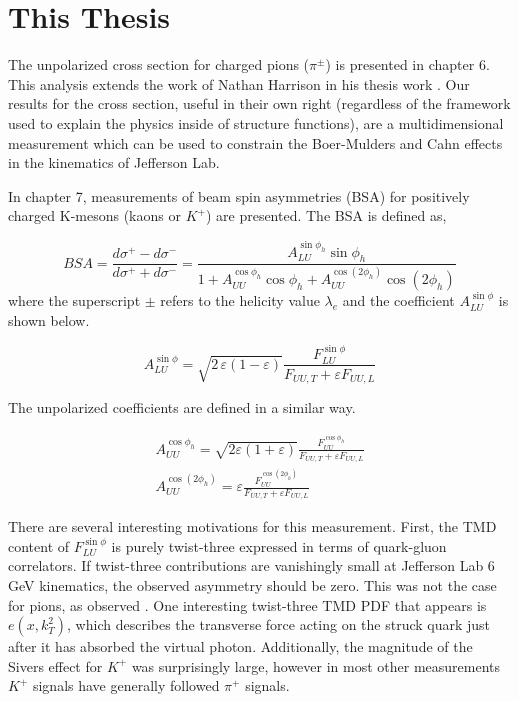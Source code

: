 \section{This Thesis}
The unpolarized cross section for charged pions ($\pi^{\pm}$) is presented in chapter 6.  This analysis extends the work of Nathan Harrison in his thesis work \cite{theses-harrison:2015}.  Our results for the cross section, useful in their own right (regardless of the framework used to explain the physics inside of structure functions), are a multidimensional measurement which can be used to constrain the Boer-Mulders and Cahn effects in the kinematics of Jefferson Lab.  

In chapter 7, measurements of beam spin asymmetries (BSA) for positively charged K-mesons (kaons or $K^+$) are presented.  The BSA is defined as, 

\begin{equation}
	BSA = \frac{d\sigma^+ - d\sigma^-}{d\sigma^+ + d\sigma^-} = \frac{A_{LU}^{\sin\phi_h} \sin\phi_h}{1 + A_{UU}^{\cos\phi_h} \cos\phi_h + A_{UU}^{\cos(2\phi_h)} \cos(2\phi_h)}
\end{equation}
where the superscript $\pm$ refers to the helicity value $\lambda_e$ and the coefficient $A_{LU}^{\sin\phi}$ is shown below.

\begin{equation}
  A_{LU}^{\sin\phi} = \sqrt{2\,\varepsilon (1-\varepsilon)} \frac{F_{LU}^{\sin\phi}}{F_{UU,T} + \varepsilon F_{UU,L}}
\end{equation}

The unpolarized coefficients are defined in a similar way.

\begin{gather}
	A_{UU}^{\cos\phi_h} = \sqrt{2\varepsilon(1+\varepsilon)} \frac{F_{UU}^{\cos\phi_h}}{F_{UU,T} + \varepsilon F_{UU,L}} \\
	A_{UU}^{\cos(2\phi_h)} = \varepsilon \frac{F_{UU}^{\cos(2\phi_h)}}{F_{UU,T} + \varepsilon F_{UU,L}}
	\label{eqn:a-coefficients}
\end{gather}

There are several interesting motivations for this measurement.  First, the TMD content of $F_{LU}^{\sin\phi}$ is purely twist-three expressed in terms of quark-gluon correlators.  If twist-three contributions are vanishingly small at Jefferson Lab 6 GeV kinematics, the observed asymmetry should be zero.  This was not the case for pions, as observed \cite{tmds-avakian:2003} \cite{theses-gohn:2012}.  One interesting twist-three TMD PDF that appears is $e(x,k_{T}^2)$, which describes the transverse force acting on the struck quark just after it has absorbed the virtual photon.  Additionally, the magnitude of the Sivers effect for $K^+$ was surprisingly large, however in most other measurements $K^+$ signals have generally followed $\pi^+$ signals.  \\  


